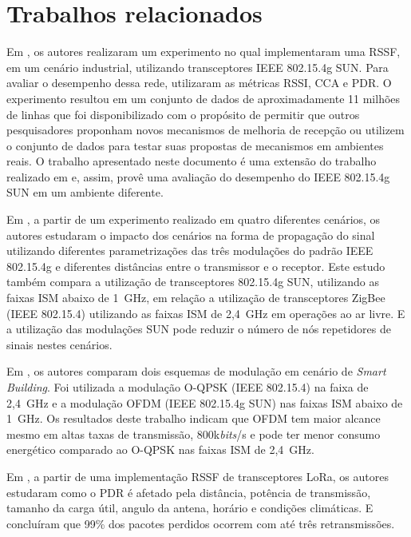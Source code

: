 \section{Trabalhos relacionados}
Em \cite{tuset2020dataset}, os autores realizaram um experimento no qual implementaram uma RSSF, em um cenário industrial, utilizando transceptores IEEE 802.15.4g SUN. Para avaliar o desempenho dessa rede, utilizaram as métricas RSSI, CCA e PDR. O experimento resultou em um conjunto de dados de aproximadamente 11 milhões de linhas que foi disponibilizado com o propósito de permitir que outros pesquisadores proponham novos mecanismos de melhoria de recepção ou utilizem o conjunto de dados para testar suas propostas de mecanismos em ambientes reais. O trabalho apresentado neste documento é uma extensão do trabalho realizado em \cite{tuset2020dataset} e, assim, provê uma avaliação do desempenho do IEEE 802.15.4g SUN em um ambiente diferente.

Em \cite{munoz2018evaluation}, a partir de um experimento realizado em quatro diferentes cenários, os autores estudaram o impacto dos cenários na forma de propagação do sinal utilizando diferentes parametrizações das três modulações do padrão IEEE 802.15.4g e diferentes distâncias entre o transmissor e o receptor. Este estudo também compara a utilização de transceptores 802.15.4g SUN, utilizando as faixas ISM abaixo de 1~GHz, em relação a utilização de transceptores ZigBee (IEEE 802.15.4) utilizando as faixas ISM de 2,4~GHz em operações ao ar livre. E a utilização das modulações SUN pode reduzir o número de nós repetidores de sinais nestes cenários.

Em  \cite{munoz2018overview}, os autores comparam dois esquemas de modulação em cenário de \emph{Smart Building}. Foi utilizada a modulação O-QPSK (IEEE 802.15.4) na faixa de 2,4~GHz e a modulação OFDM (IEEE 802.15.4g SUN) nas faixas ISM abaixo de 1~GHz. Os resultados deste trabalho indicam que OFDM tem maior alcance mesmo em altas taxas de transmissão, 800k\emph{bits}/s e pode ter menor consumo energético comparado ao O-QPSK nas faixas ISM de 2,4~GHz.

Em \cite{wang2017performance}, a partir de uma implementação RSSF de transceptores LoRa, os autores estudaram como o PDR é afetado pela distância, potência de transmissão, tamanho da carga útil, angulo da antena, horário e condições climáticas. E concluíram que 99\% dos pacotes perdidos ocorrem com até três retransmissões.
